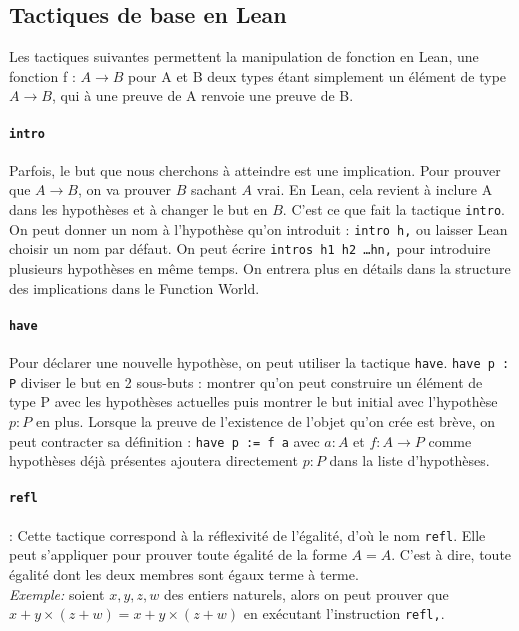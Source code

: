 \subsection{Tactiques de base en Lean}


Les tactiques suivantes permettent la manipulation de fonction en Lean, une fonction f : $A\to B$ pour A et B deux types étant simplement un élément de type $A\to B$, qui à une preuve de A renvoie une preuve de B.\\
\paragraph{\texttt{intro}}

Parfois, le but que nous cherchons à atteindre est une implication. Pour prouver que $A \to B$, on va prouver $B$ sachant $A$ vrai. En Lean, cela revient à inclure A dans les hypothèses et à changer le but en $B$. C'est ce que fait la tactique \texttt{intro}. On peut donner un nom à l'hypothèse qu'on introduit : \texttt{intro h,} ou laisser Lean choisir un nom par défaut.
On peut écrire \texttt{intros h1 h2 \ldots hn,} pour introduire plusieurs hypothèses en même temps.
On entrera plus en détails dans la structure des implications dans le Function World.

\paragraph{\texttt{have}}

Pour déclarer une nouvelle hypothèse, on peut utiliser la tactique \texttt{have}.
\texttt{have p : P} diviser le but en 2 sous-buts : montrer qu'on peut construire un élément de type P avec les hypothèses actuelles puis montrer le but initial avec l'hypothèse $p : P$ en plus.
Lorsque la preuve de l'existence de l'objet qu'on crée est brève, on peut contracter sa définition :
\texttt{have p := f a} avec $a : A$ et $f : A \to P$ comme hypothèses déjà présentes ajoutera directement $p : P$ dans la liste d'hypothèses.  


\paragraph { \texttt{refl}}: Cette tactique correspond à la réflexivité de l'égalité, d'où le nom \texttt{refl}. Elle peut s'appliquer pour prouver toute égalité de la forme $A=A$. C'est à dire, toute égalité dont les deux membres sont égaux terme à terme. \\
\textit{Exemple:} soient $x,y,z,w$ des entiers naturels, alors on peut prouver que $x+y \times (z+w)=x+y \times (z+w)$ en exécutant l'instruction \texttt{refl,}.
